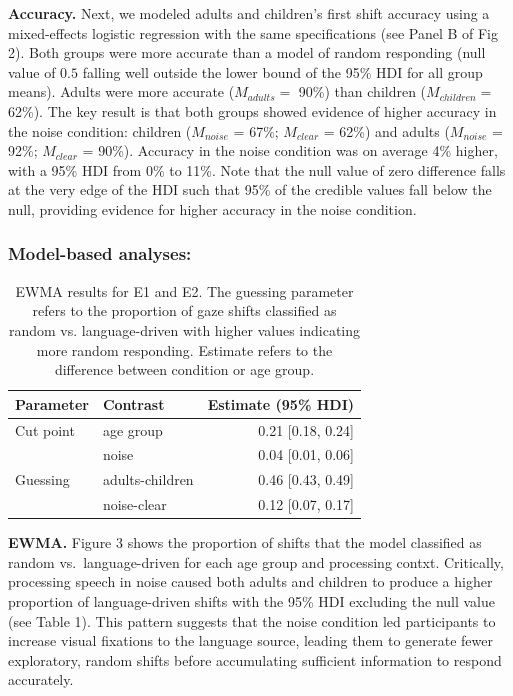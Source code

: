 \documentclass[10pt, letterpaper]{article}
\begin{document}
\textbf{Accuracy.} Next, we modeled adults and children's first shift
accuracy using a mixed-effects logistic regression with the same
specifications (see Panel B of Fig 2). Both groups were more accurate
than a model of random responding (null value of \(0.5\) falling well
outside the lower bound of the 95\% HDI for all group means). Adults
were more accurate (\(M_{adults} =\) 90\%) than children
(\(M_{children} =\) 62\%). The key result is that both groups showed
evidence of higher accuracy in the noise condition: children
(\(M_{noise}\) = 67\%; \(M_{clear}\) = 62\%) and adults (\(M_{noise}\) =
92\%; \(M_{clear}\) = 90\%). Accuracy in the noise condition was on
average 4\% higher, with a 95\% HDI from 0\% to 11\%. Note that the null
value of zero difference falls at the very edge of the HDI such that
95\% of the credible values fall below the null, providing evidence for
higher accuracy in the noise condition.

\subsubsection{Model-based analyses:}\label{model-based-analyses}

\begin{table}[t]
\centering
\begin{tabular}{llr}
  \hline
Parameter & Contrast & Estimate (95\% HDI) \\ 
  \hline
Cut point & age group & 0.21 [0.18, 0.24] \\ 
   & noise & 0.04 [0.01, 0.06] \\ 
  Guessing & adults-children & 0.46 [0.43, 0.49] \\ 
   & noise-clear & 0.12 [0.07, 0.17] \\ 
   \hline
\end{tabular}
\caption{EWMA results for E1 and E2. The guessing parameter refers to the proportion of gaze shifts classified as random vs. language-driven with higher values indicating more random responding. Estimate refers to the difference between condition or age group.} 
\end{table}

\textbf{EWMA.} Figure 3 shows the proportion of shifts that the model
classified as random vs.~language-driven for each age group and
processing contxt. Critically, processing speech in noise caused both
adults and children to produce a higher proportion of language-driven
shifts with the 95\% HDI excluding the null value (see Table 1). This
pattern suggests that the noise condition led participants to increase
visual fixations to the language source, leading them to generate fewer
exploratory, random shifts before accumulating sufficient information to
respond accurately.
\end{document}
